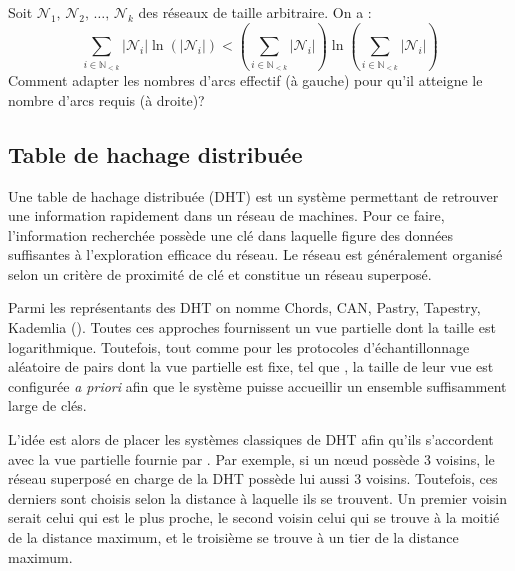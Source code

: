 \begin{problem}
  Soit $\mathcal{N}_1,\, \mathcal{N}_2,\, \ldots ,\, \mathcal{N}_k$ des réseaux
  de taille arbitraire. On a :
\begin{equation}
  \sum\limits_{i \in \mathbb{N}_{<k}} |\mathcal{N}_i|\ln (|\mathcal{N}_i|) < (\sum\limits_{i \in \mathbb{N}_{<k}} |\mathcal{N}_i|)\ln{(\sum\limits_{i \in \mathbb{N}_{<k}} |\mathcal{N}_i|)}
\end{equation}
Comment adapter les nombres d'arcs effectif (à gauche) pour qu'il atteigne le
nombre d'arcs requis (à droite)?
\end{problem}



\subsection{Table de hachage distribuée}

Une table de hachage distribuée (DHT) est un système permettant de retrouver une
information rapidement dans un réseau de machines. Pour ce faire, l'information
recherchée possède une clé dans laquelle figure des données suffisantes à
l'exploration efficace du réseau. Le réseau est généralement organisé selon un
critère de proximité de clé et constitue un réseau superposé. 

Parmi les représentants des DHT on nomme Chords, CAN, Pastry, Tapestry, Kademlia
(\REF).  Toutes ces approches fournissent un vue partielle dont la taille est
logarithmique. Toutefois, tout comme pour les protocoles d'échantillonnage
aléatoire de pairs dont la vue partielle est fixe, tel que \CYCLON, la taille de
leur vue est configurée \emph{a priori} afin que le système puisse accueillir un
ensemble suffisamment large de clés.

L'idée est alors de placer les systèmes classiques de DHT afin qu'ils
s'accordent avec la vue partielle fournie par \SPRAY. Par exemple, si un nœud
\SPRAY possède 3 voisins, le réseau superposé en charge de la DHT possède lui
aussi 3 voisins. Toutefois, ces derniers sont choisis selon la distance à
laquelle ils se trouvent. Un premier voisin serait celui qui est le plus proche,
le second voisin celui qui se trouve à la moitié de la distance maximum, et le
troisième se trouve à un tier de la distance maximum.

